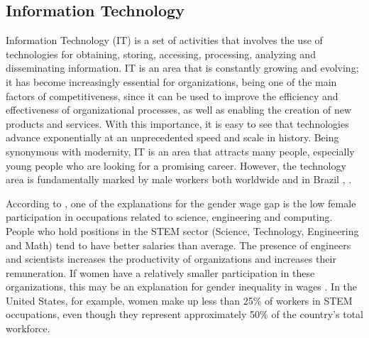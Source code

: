  \subsection{Information Technology}

 Information Technology (IT) is a set of activities that involves the use of technologies for obtaining, storing, accessing, processing, analyzing and disseminating information. IT is an area that is constantly growing and evolving; it has become increasingly essential for organizations, being one of the main factors of competitiveness, since it can be used to improve the efficiency and effectiveness of organizational processes, as well as enabling the creation of new products and services. With this importance, it is easy to see that technologies advance exponentially at an unprecedented speed and scale in history. Being synonymous with modernity, IT is an area that attracts many people, especially young people who are looking for a promising career. However, the technology area is fundamentally marked by male workers both worldwide and in Brazil \cite{de2021evidencias}, \cite{nunes2016genero}.

 According to \cite{de2021evidencias}, one of the explanations for the gender wage gap is the low female participation in occupations related to science, engineering and computing. People who hold positions in the STEM sector (Science, Technology, Engineering and Math) tend to have better salaries than average. The presence of engineers and scientists increases the productivity of organizations and increases their remuneration. If women have a relatively smaller participation in these organizations, this may be an explanation for gender inequality in wages \cite{barth2017effects}. In the United States, for example, women make up less than 25\% of workers in STEM occupations, even though they represent approximately 50\% of the country's total workforce.